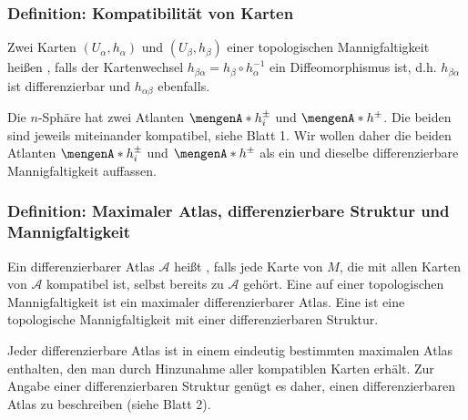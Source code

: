 \subsubsection{Definition: Kompatibilität von Karten} %
\label{ssub:124}
Zwei Karten $(U_\alpha, h_\alpha)$ und $(U_\beta, h_\beta)$ einer topologischen Mannigfaltigkeit heißen , falls der Kartenwechsel 
$h_{\beta \alpha} = h_\beta \circ h_\alpha ^{-1}$ ein Diffeomorphismus ist, d.h. $h_{\beta \alpha}$ ist differenzierbar und $h_{\alpha \beta}$ ebenfalls.

Die $n$-Sphäre hat zwei Atlanten $\set{h_i^\pm} $ und $\set{h^\pm} $. Die beiden sind jeweils miteinander kompatibel, siehe Blatt 1. Wir wollen daher die beiden Atlanten
$\set{h_i^\pm} $ und $\set{h^\pm} $ als ein und dieselbe differenzierbare Mannigfaltigkeit auffassen.

\subsubsection{Definition: Maximaler Atlas, differenzierbare Struktur und Mannigfaltigkeit} %
\label{ssub:125}
Ein differenzierbarer Atlas $\mathcal{A} $ heißt , falls jede Karte von $M$, die mit allen Karten von $\mathcal{A} $ kompatibel ist, selbst bereits zu 
$\mathcal{A}$ gehört. Eine  auf einer topologischen Mannigfaltigkeit ist ein maximaler differenzierbarer Atlas. Eine 
 ist eine topologische Mannigfaltigkeit mit einer differenzierbaren Struktur.

Jeder differenzierbare Atlas ist in einem eindeutig bestimmten maximalen Atlas enthalten, den man durch Hinzunahme aller kompatiblen Karten erhält. Zur Angabe einer 
differenzierbaren Struktur genügt es daher, einen differenzierbaren Atlas zu beschreiben (siehe Blatt 2).

